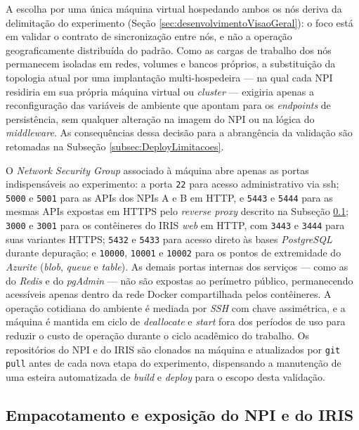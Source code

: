 A escolha por uma única máquina virtual hospedando ambos os nós deriva da delimitação do experimento (Seção \ref{sec:desenvolvimentoVisaoGeral}): o foco está em validar o contrato de sincronização entre nós, e não a operação geograficamente distribuída do padrão. Como as cargas de trabalho dos nós permanecem isoladas em redes, volumes e bancos próprios, a substituição da topologia atual por uma implantação multi-hospedeira --- na qual cada NPI residiria em sua própria máquina virtual ou \textit{cluster} --- exigiria apenas a reconfiguração das variáveis de ambiente que apontam para os \emph{endpoints} de persistência, sem qualquer alteração na imagem do NPI ou na lógica do \textit{middleware}. As consequências dessa decisão para a abrangência da validação são retomadas na Subseção \ref{subsec:DeployLimitacoes}.

O \textit{Network Security Group} associado à máquina abre apenas as portas indispensáveis ao experimento: a porta \texttt{22} para acesso administrativo via \gls{ssh}; \texttt{5000} e \texttt{5001} para as APIs dos NPIs A e B em HTTP, e \texttt{5443} e \texttt{5444} para as mesmas APIs expostas em HTTPS pelo \textit{reverse proxy} descrito na Subseção \ref{subsec:DeployServicos}; \texttt{3000} e \texttt{3001} para os contêineres do IRIS \emph{web} em HTTP, com \texttt{3443} e \texttt{3444} para suas variantes HTTPS; \texttt{5432} e \texttt{5433} para acesso direto às bases \textit{PostgreSQL} durante depuração; e \texttt{10000}, \texttt{10001} e \texttt{10002} para os pontos de extremidade do \textit{Azurite} (\textit{blob}, \textit{queue} e \textit{table}). As demais portas internas dos serviços --- como as do \textit{Redis} e do \textit{pgAdmin} --- não são expostas ao perímetro público, permanecendo acessíveis apenas dentro da rede Docker compartilhada pelos contêineres. A operação cotidiana do ambiente é mediada por \textit{SSH} com chave assimétrica, e a máquina é mantida em ciclo de \textit{deallocate} e \textit{start} fora dos períodos de uso para reduzir o custo de operação durante o ciclo acadêmico do trabalho. Os repositórios do NPI e do IRIS são clonados na máquina e atualizados por \texttt{git pull} antes de cada nova etapa do experimento, dispensando a manutenção de uma esteira automatizada de \textit{build} e \textit{deploy} para o escopo desta validação.

\subsection{Empacotamento e exposição do NPI e do IRIS}\label{subsec:DeployServicos}

